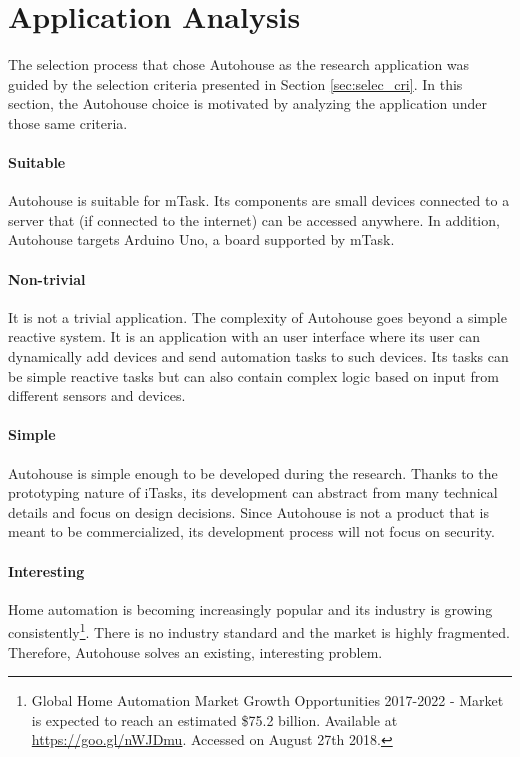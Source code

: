 \section{Application Analysis}\label{sec:app_analysis}

The selection process that chose Autohouse as the research application was guided by the selection criteria presented in Section \ref{sec:selec_cri}. In this section, the Autohouse choice is motivated by analyzing the application under those same criteria.

\paragraph{Suitable} Autohouse is suitable for mTask. Its components are small devices connected to a server that (if connected to the internet) can be accessed anywhere. In addition, Autohouse targets Arduino Uno, a board supported by mTask.

\paragraph{Non-trivial} It is not a trivial application. The complexity of Autohouse goes beyond a simple reactive system. It is an application with an user interface where its user can dynamically add devices and send automation tasks to such devices. Its tasks can be simple reactive tasks but can also contain complex logic based on input from different sensors and devices.

\paragraph{Simple} Autohouse is  simple enough to be developed during the research. Thanks to the prototyping nature of iTasks, its development can abstract from many technical details and focus on design decisions. Since Autohouse is not a product that is meant to be commercialized, its development process will not focus on security.

\paragraph{Interesting} Home automation is becoming increasingly popular and its industry is growing consistently\footnote{Global Home Automation Market Growth Opportunities 2017-2022 - Market is expected to reach an estimated \$75.2 billion. Available at \url{https://goo.gl/nWJDmu}. Accessed on August 27th 2018.}. There is no industry standard and the market is highly fragmented. Therefore, Autohouse solves an existing, interesting problem.

